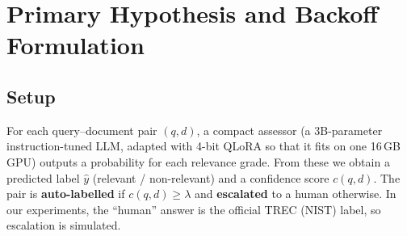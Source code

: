 \documentclass[11pt,a4paper]{article}
\begin{document}
\section{Primary Hypothesis and Backoff Formulation}

\subsection{Setup}
For each query--document pair $(q,d)$, a compact assessor (a 3B-parameter instruction-tuned LLM, adapted with 4-bit QLoRA so that it fits on one 16\,GB GPU) outputs a probability for each relevance grade. From these we obtain a predicted label $\hat{y}$ (relevant / non-relevant) and a confidence score $c(q,d)$. The pair is \textbf{auto-labelled} if $c(q,d)\ge\lambda$ and \textbf{escalated} to a human otherwise. In our experiments, the ``human'' answer is the official TREC (NIST) label, so escalation is simulated.
\end{document}
